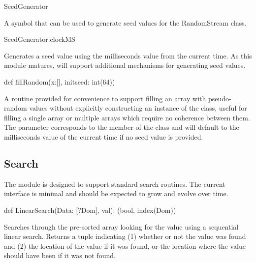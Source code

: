 \begin{protohead}
SeedGenerator
\end{protohead}
\begin{protobody}
A symbol that can be used to generate seed values for the RandomStream
class.
\end{protobody}

\begin{protohead}
SeedGenerator.clockMS
\end{protohead}
\begin{protobody}
Generates a seed value using the milliseconds value from the current
time.  As this module matures,  will support
additional mechanisms for generating seed values.
\end{protobody}

\begin{protohead}
def fillRandom(x:[], initseed: int(64))
\end{protohead}
\begin{protobody}

A routine provided for convenience to support filling an array
 with pseudo-random values without explicitly constructing an
instance of the  class, useful for filling a single
array or multiple arrays which require no coherence between them.  The
 parameter corresponds to the  member of the
 class and will default to the milliseconds value
of the current time if no seed value is provided.
\end{protobody}


\subsection{Search}
\label{Search}

The  module is designed to support standard search
routines.  The current interface is minimal and should be expected to
grow and evolve over time.

\begin{protohead}
def LinearSearch(Data: [?Dom], val): (bool, index(Dom))
\end{protohead}
\begin{protobody}
Searches through the pre-sorted array  looking for the
value  using a sequential linear search.  Returns a tuple
indicating (1) whether or not the value was found and (2) the location
of the value if it was found, or the location where the value should
have been if it was not found.
\end{protobody}


